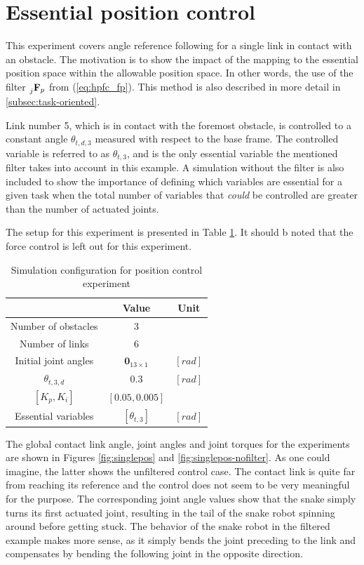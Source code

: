 \section{Essential position control}

This experiment covers angle reference following for a single link in contact with an obstacle. The motivation is to show the impact of the mapping to the essential position space within the allowable position space. In other words, the use of the filter $\prescript{}{j}{\mathbf{F}}_{p}$ from (\ref{eq:hpfc_fp}). This method is also described in more detail in \ref{subsec:task-oriented}.

Link number 5, which is in contact with the foremost obstacle, is controlled to a constant angle $\theta_{t,d,3}$ measured with respect to the base frame. The controlled variable is referred to as $\theta_{t,3}$, and is the only essential variable the mentioned filter takes into account in this example. A simulation without the filter is also included to show the importance of defining which variables are essential for a given task when the total number of variables that \textit{could} be controlled are greater than the number of actuated joints.

The setup for this experiment is presented in Table \ref{tab:exp_single_pos}. It should b noted that the force control is left out for this experiment.

\begin{table}[]
    \centering
    \begin{tabular}{|c|c|c|}
        \hline
        & Value & Unit\\
        \hline
        Number of obstacles & $3$ & \\
        Number of links & $6$ & \\
        Initial joint angles & $\mathbf{0}_{13 \times 1}$ & $[rad]$ \\
        $\theta_{t,3,d}$ & $0.3$ & $[rad]$ \\
        $[K_p, K_i]$ & $[0.05, 0.005]$ &\\
        Essential variables & $[\theta_{t,3}]$ & $[rad]$ \\
        \hline
    \end{tabular}
    \caption{Simulation configuration for position control experiment}
    \label{tab:exp_single_pos}
\end{table}

The global contact link angle, joint angles and joint torques for the experiments are shown in Figures \ref{fig:singlepos} and \ref{fig:singlepos-nofilter}. As one could imagine, the latter shows the unfiltered control case. The contact link is quite far from reaching its reference and the control does not seem to be very meaningful for the purpose. The corresponding joint angle values show that the snake simply turns its first actuated joint, resulting in the tail of the snake robot spinning around before getting stuck. The behavior of the snake robot in the filtered example makes more sense, as it simply bends the joint preceding to the link and compensates by bending the following joint in the opposite direction.

